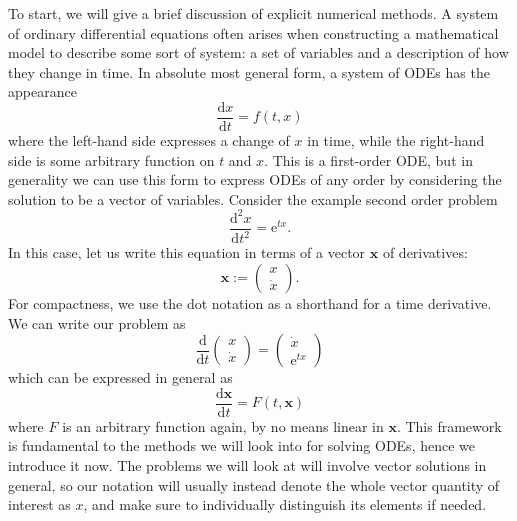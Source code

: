 To start, we will give a brief discussion of explicit numerical methods.
A system of ordinary differential equations often arises when constructing a mathematical model to describe some sort of system: a set of variables and a description of how they change in time.
In absolute most general form, a system of ODEs has the appearance
\begin{equation}
    \frac{\mathrm{d}x}{\mathrm{d}t} = f(t,x)
\end{equation}
where the left-hand side expresses a change of $x$ in time, while the right-hand side is some arbitrary function on $t$ and $x$.
This is a first-order ODE, but in generality we can use this form to express ODEs of any order by considering the solution to be a vector of variables.
Consider the example second order problem
\begin{equation*}
    \frac{\mathrm{d}^2 x}{\mathrm{d}t^2} = \mathrm{e}^{tx}.
\end{equation*}
In this case, let us write this equation in terms of a vector $\mathbf{x}$ of derivatives:
\begin{equation*}
    \mathbf{x} := \begin{pmatrix}
        x \\
        \dot{x}
    \end{pmatrix}.
\end{equation*}
For compactness, we use the dot notation as a shorthand for a time derivative.
We can write our problem as
\begin{equation*}
    \frac{\mathrm{d}}{\mathrm{d}t} \begin{pmatrix}
        x \\
        \dot{x}
    \end{pmatrix} = \begin{pmatrix}
        \dot{x} \\
        \mathrm{e}^{tx}
    \end{pmatrix}
\end{equation*}
which can be expressed in general as
\begin{equation*}
    \frac{\mathrm{d}\mathbf{x}}{\mathrm{d}t} = F(t,\mathbf{x})
\end{equation*}
where $F$ is an arbitrary function again, by no means linear in $\mathbf{x}$.
This framework is fundamental to the methods we will look into for solving ODEs, hence we introduce it now.
The problems we will look at will involve vector solutions in general, so our notation will usually instead denote the whole vector quantity of interest as $x$,
and make sure to individually distinguish its elements if needed.

